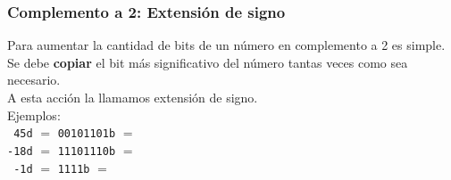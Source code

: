 \documentclass[aspectratio=169]{beamer}
\begin{document}
\begin{frame}[fragile,t]
    \frametitle{\textbf{Complemento a 2}: Extensión de signo}
    Para aumentar la cantidad de bits de un número en complemento a 2 es simple.\\
    \bigskip
    Se debe \textbf{copiar} el bit más significativo del número tantas veces como sea necesario.\\
    A esta acción la llamamos extensión de signo.\\
    \bigskip
    Ejemplos:\\
    \bigskip 
    \hspace{1cm} \verb| 45d| $=$ \verb|00101101b| $=$ 
    \\
    \bigskip
    \hspace{1cm} \verb|-18d| $=$ \verb|11101110b| $=$
    \\
    \bigskip
    \hspace{1cm} \verb| -1d| $=$ \verb|1111b|     $=$
    \\
\end{frame}
\end{document}
